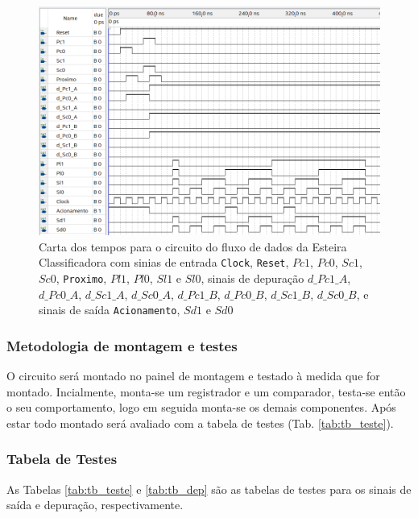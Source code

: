 \documentclass[a4,12pt]{horizon-theme}
\begin{document}
\begin{figure}[!ht]
    \centering
    \includegraphics[width=\textwidth]{carta_tempos.png}
    \caption{Carta dos tempos para o circuito do fluxo de dados da Esteira Classificadora com sinias de entrada \texttt{Clock}, \texttt{Reset}, $Pc1$, $Pc0$, $Sc1$, $Sc0$, \texttt{Proximo}, $Pl1$, $Pl0$, $Sl1$ e $Sl0$, sinais de depuração $d\_Pc1\_A$, $d\_Pc0\_A$, $d\_Sc1\_A$, $d\_Sc0\_A$, $d\_Pc1\_B$, $d\_Pc0\_B$, $d\_Sc1\_B$, $d\_Sc0\_B$, e sinais de saída \texttt{Acionamento}, $Sd1$ e $Sd0$}
    \label{fig:carta_tempos}
\end{figure}

\newpage
\subsubsection{Metodologia de montagem e testes}
\label{sec:plan_ff_montagem}
O circuito será montado no painel de montagem e testado à medida que for montado. Incialmente, monta-se um registrador e um comparador, testa-se então o seu comportamento, logo em seguida monta-se os demais componentes. Após estar todo montado será avaliado com a tabela de testes (Tab. \ref{tab:tb_teste}).


\subsubsection{Tabela de Testes}

As Tabelas \ref{tab:tb_teste} e \ref{tab:tb_dep} são as tabelas de testes para os sinais de saída e depuração, respectivamente. 
\end{document}
